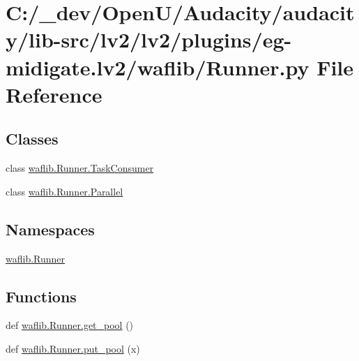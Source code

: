 \hypertarget{lv2_2plugins_2eg-midigate_8lv2_2waflib_2_runner_8py}{}\section{C\+:/\+\_\+dev/\+Open\+U/\+Audacity/audacity/lib-\/src/lv2/lv2/plugins/eg-\/midigate.lv2/waflib/\+Runner.py File Reference}
\label{lv2_2plugins_2eg-midigate_8lv2_2waflib_2_runner_8py}
\subsection*{Classes}
\begin{DoxyCompactItemize}
\item 
class \hyperlink{classwaflib_1_1_runner_1_1_task_consumer}{waflib.\+Runner.\+Task\+Consumer}
\item 
class \hyperlink{classwaflib_1_1_runner_1_1_parallel}{waflib.\+Runner.\+Parallel}
\end{DoxyCompactItemize}
\subsection*{Namespaces}
\begin{DoxyCompactItemize}
\item 
 \hyperlink{namespacewaflib_1_1_runner}{waflib.\+Runner}
\end{DoxyCompactItemize}
\subsection*{Functions}
\begin{DoxyCompactItemize}
\item 
def \hyperlink{namespacewaflib_1_1_runner_a30bf6bcb906d0ab627890f2174b1e463}{waflib.\+Runner.\+get\+\_\+pool} ()
\item 
def \hyperlink{namespacewaflib_1_1_runner_a1e26175912d7655d9c38a50d71caeb6f}{waflib.\+Runner.\+put\+\_\+pool} (x)
\end{DoxyCompactItemize}
